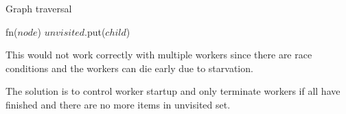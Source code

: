 \begin{algorithm}[H]
    \caption{Graph traversal}
\begin{algorithmic}[1]

        
        \Spawn
                \State fn($node$)
                        \State $unvisited$.put($child$)
                    \EndIf
                \EndFor
            \EndWhile
        \EndSpawn

    \EndFunction
\end{algorithmic}
\end{algorithm}

This would not work correctly with multiple workers since there are race conditions and the workers can die early due to starvation.

The solution is to control worker startup and only terminate workers if all have finished and there are no more items in unvisited set.

